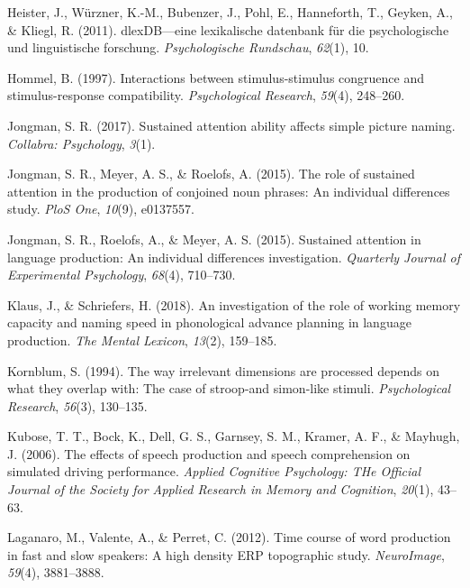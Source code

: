 \documentclass[
  man,floatsintext]{apa6}
\newlength{\cslhangindent}
\newlength{\cslentryspacingunit} %
\newenvironment{CSLReferences}[2] %
 {%
  \setlength{\parindent}{0pt}
  \ifodd #1
  \let\oldpar\par
  \def\par{\hangindent=\cslhangindent\oldpar}
  \fi
  \setlength{\parskip}{#2\cslentryspacingunit}
 }%
 {}
\begin{document}
\begin{CSLReferences}{1}{0}
\leavevmode{}%
Heister, J., Würzner, K.-M., Bubenzer, J., Pohl, E., Hanneforth, T., Geyken, A., \& Kliegl, R. (2011). dlexDB---eine lexikalische datenbank f{ü}r die psychologische und linguistische forschung. \emph{Psychologische Rundschau}, \emph{62}(1), 10.

\leavevmode{}%
Hommel, B. (1997). Interactions between stimulus-stimulus congruence and stimulus-response compatibility. \emph{Psychological Research}, \emph{59}(4), 248--260.

\leavevmode{}%
Jongman, S. R. (2017). Sustained attention ability affects simple picture naming. \emph{Collabra: Psychology}, \emph{3}(1).

\leavevmode{}%
Jongman, S. R., Meyer, A. S., \& Roelofs, A. (2015). The role of sustained attention in the production of conjoined noun phrases: An individual differences study. \emph{PloS One}, \emph{10}(9), e0137557.

\leavevmode{}%
Jongman, S. R., Roelofs, A., \& Meyer, A. S. (2015). Sustained attention in language production: An individual differences investigation. \emph{Quarterly Journal of Experimental Psychology}, \emph{68}(4), 710--730.

\leavevmode{}%
Klaus, J., \& Schriefers, H. (2018). An investigation of the role of working memory capacity and naming speed in phonological advance planning in language production. \emph{The Mental Lexicon}, \emph{13}(2), 159--185.

\leavevmode{}%
Kornblum, S. (1994). The way irrelevant dimensions are processed depends on what they overlap with: The case of stroop-and simon-like stimuli. \emph{Psychological Research}, \emph{56}(3), 130--135.

\leavevmode{}%
Kubose, T. T., Bock, K., Dell, G. S., Garnsey, S. M., Kramer, A. F., \& Mayhugh, J. (2006). The effects of speech production and speech comprehension on simulated driving performance. \emph{Applied Cognitive Psychology: THe Official Journal of the Society for Applied Research in Memory and Cognition}, \emph{20}(1), 43--63.

\leavevmode{}%
Laganaro, M., Valente, A., \& Perret, C. (2012). Time course of word production in fast and slow speakers: A high density ERP topographic study. \emph{NeuroImage}, \emph{59}(4), 3881--3888.


\end{CSLReferences}
\end{document}
